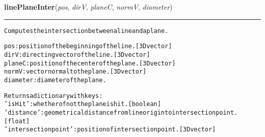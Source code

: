     \vspace{0.5ex}

\hspace{.8\funcindent}\begin{boxedminipage}{\funcwidth}

    \raggedright \textbf{linePlaneInter}(\textit{pos}, \textit{dirV}, \textit{planeC}, \textit{normV}, \textit{diameter})

    \vspace{-1.5ex}

    \rule{\textwidth}{0.5\fboxrule}
\setlength{\parskip}{2ex}
\begin{alltt}
Computes the intersection between a line and a plane.

pos: position of the beginning of the line. [3D vector]
dirV: directing vector of the line. [3D vector]
planeC: position of the center of the plane. [3D vector]
normV: vector normal to the plane. [3D vector]
diameter: diameter of the plane.

Returns a dictionary with keys:
    'isHit': whether of not the plane is hit. [boolean]
    'distance': geometrical distance from line origin to intersection point.
        [float]
    'intersection point': position of intersection point. [3D vector]
\end{alltt}

\setlength{\parskip}{1ex}
    \end{boxedminipage}

    \label{theia:helpers:geometry:lineSurfInter}

    \vspace{0.5ex}


